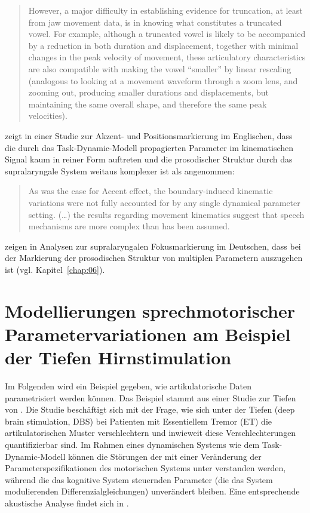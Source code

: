 \begin{quote}
	However, a major difficulty in establishing evidence for truncation, at least from jaw movement data, is in knowing what constitutes a truncated vowel. For example, although a truncated vowel is likely to be accompanied by a reduction in both duration and displacement, together with minimal changes in the peak velocity of movement, these articulatory characteristics are also compatible with making the vowel ``smaller'' by linear rescaling (analogous to looking at a movement waveform through a zoom lens, and zooming out, producing smaller durations and displacements, but maintaining the same overall shape, and therefore the same peak velocities). \citep[][307]{Harrington1995}
\end{quote}

\citet{Cho2006} zeigt in einer Studie zur Akzent- und Positionsmarkierung im Englischen, dass die durch das Task-Dynamic-Modell propagierten Parameter im kinematischen Signal kaum in reiner Form auftreten und die  prosodischer Struktur durch das supralaryngale System weitaus komplexer ist als angenommen:

\begin{quote}
	As was the case for Accent effect, the boundary-induced kinematic variations were not fully accounted for by any single dynamical parameter setting. (\dots{}) the results regarding movement kinematics suggest that speech mechanisms are more complex than has been assumed. \citep[][539, 545]{Cho2006}
\end{quote}

\citet{Mücke2014b} zeigen in Analysen zur supralaryngalen Fokusmarkierung im Deutschen, dass bei der Markierung der prosodischen Struktur von multiplen Parametern auszugehen ist (vgl. Kapitel~\ref{chap:06}).

\section[Modellierungen sprechmotorischer Parametervariationen]{Modellierungen sprechmotorischer Parametervariationen am Beispiel der Tiefen Hirnstimulation}
\label{sec:0402}

Im Folgenden wird ein Beispiel gegeben, wie artikulatorische Daten parametrisiert werden können. Das Beispiel stammt aus einer Studie zur Tiefen  von \citet{Mücke2014a}. Die Studie beschäftigt sich mit der Frage, wie sich unter der Tiefen  (deep brain stimulation, DBS) bei Patienten mit Essentiellem Tremor (ET) die artikulatorischen Muster verschlechtern und inwieweit diese Verschlechterungen quantifizierbar sind. Im Rahmen eines dynamischen Systems wie dem Task-Dynamic-Modell können die Störungen der  mit einer Veränderung der Parameterspezifikationen des motorischen Systems unter  verstanden werden, während die das kognitive System steuernden Parameter (die das System modulierenden Differenzialgleichungen) unverändert bleiben. Eine entsprechende akustische Analyse findet sich in \citet{Mücke2014a}.

